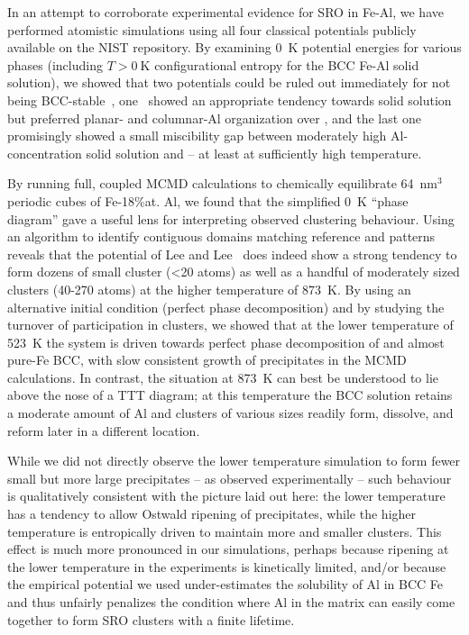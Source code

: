 In an attempt to corroborate experimental evidence for SRO in Fe-Al, we have performed atomistic simulations using all four classical potentials publicly available on the NIST repository.
By examining 0~K potential energies for various phases (including $T>0~\mathrm{K}$ configurational entropy for the BCC Fe-Al solid solution), we showed that two potentials could be ruled out immediately for not being BCC-stable~\cite{farkas2020model, jelinek2012modified}, one~\cite{mendelev2005effect} showed an appropriate tendency towards solid solution but preferred planar- and columnar-Al organization over \DOTHREE, and the last one~\cite{lee2010modified} promisingly showed a small miscibility gap between moderately high Al-concentration solid solution and \DOTHREE -- at least at sufficiently high temperature.

By running full, coupled MCMD calculations to chemically equilibrate 64~$\mathrm{nm}^3$ periodic cubes of Fe-18\%at. Al, we found that the simplified 0~K ``phase diagram'' gave a useful lens for interpreting observed clustering behaviour.
Using an algorithm to identify contiguous domains matching reference \DOTHREE and \BTWO patterns reveals that the potential of Lee and Lee~\cite{lee2010modified} does indeed show a strong tendency to form dozens of small cluster (<20 atoms) as well as a handful of moderately sized clusters (40-270 atoms) at the higher temperature of 873~K.
By using an alternative initial condition (perfect phase decomposition) and by studying the turnover of participation in \DOTHREE clusters, we showed that at the lower temperature of 523~K the system is driven towards perfect phase decomposition of \DOTHREE and almost pure-Fe BCC, with slow consistent growth of precipitates in the MCMD calculations.
In contrast, the situation at 873~K can best be understood to lie above the nose of a TTT diagram;
at this temperature the BCC solution retains a moderate amount of Al and clusters of various sizes readily form, dissolve, and reform later in a different location.

While we did not directly observe the lower temperature simulation to form fewer small but more large precipitates -- as observed experimentally -- such behaviour is qualitatively consistent with the picture laid out here: the lower temperature has a tendency to allow Ostwald ripening of precipitates, while the higher temperature is entropically driven to maintain more and smaller clusters.
This effect is much more pronounced in our simulations, perhaps because ripening at the lower temperature in the experiments is kinetically limited, and/or because the empirical potential we used under-estimates the solubility of Al in BCC Fe and thus unfairly penalizes the condition where Al in the matrix can easily come  together to form SRO clusters with a finite lifetime.
